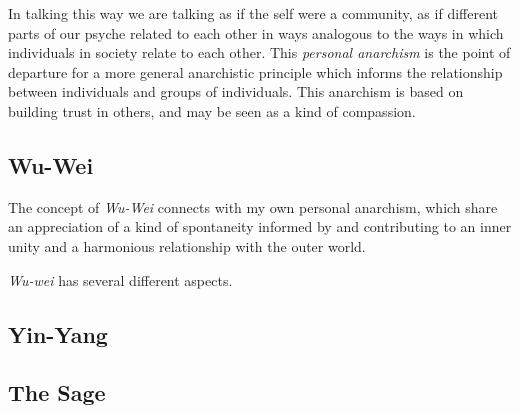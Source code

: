 \documentclass[numreferences]{rbjk}
\begin{document}
\begin{article}
In talking this way we are talking as if the self were a community, as if different parts of our psyche related to each other in ways analogous to the ways in which individuals in society relate to each other.
This {\it personal anarchism} is the point of departure for a more general anarchistic principle which informs the relationship between individuals and groups of individuals.
This anarchism is based on building trust in others, and may be seen as a kind of compassion.

\subsection{Wu-Wei}

The concept of {\it Wu-Wei} connects with my own personal anarchism, which share an appreciation of a kind of spontaneity informed by and contributing to an inner unity and a harmonious relationship with the outer world.

{\it Wu-wei} has several different aspects.

\subsection{Yin-Yang}


\subsection{The Sage}



%
%

\twocolumn[
]
{\small
\printindex
}

\end{article}
\end{document}
